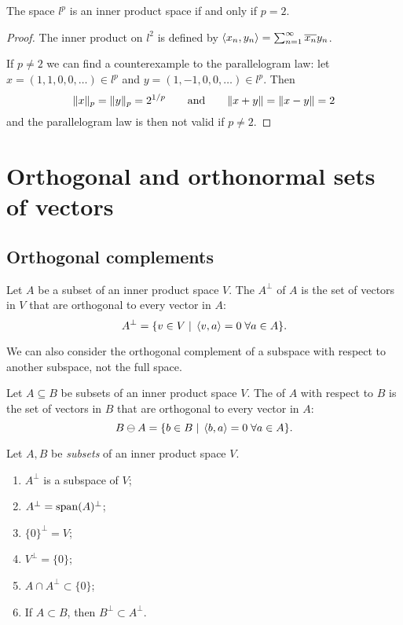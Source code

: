 \begin{corollary}
The space $l^p$ is an inner product space \textup{if and only if} $p=2$.
\end{corollary}
\begin{proof}
The inner product on $l^2$ is defined by $\left\langle x_n, y_n \right\rangle = \sum_{n=1}^\infty \overline{x_n}y_n$.

If $p\neq 2$ we can find a counterexample to the parallelogram law: let $x=(1,1,0,0,\ldots)\in l^p$ and $y = (1,-1,0,0,\ldots)\in l^p$. Then
\[ \lVert x\rVert_p = \lVert y\rVert_p = 2^{1/p} \qquad \text{and} \qquad \lVert x+y\rVert = \lVert x-y\rVert = 2 \]
and the parallelogram law is then not valid if $p\neq 2$.
\end{proof}

\section{Orthogonal and orthonormal sets of vectors}
\subsection{Orthogonal complements}
\begin{definition}
Let $A$ be a subset of an inner product space $V$. The  $A^\perp$ of $A$ is the set of vectors in $V$ that are orthogonal to every vector in $A$:
\[ A^\perp = \{ v\in V\;|\; \left\langle v,a \right\rangle=0\; \forall a\in A \}. \]
\end{definition}
We can also consider the orthogonal complement of a subspace with respect to another subspace, not the full space.
\begin{definition}
Let $A\subseteq B$ be subsets of an inner product space $V$. The  of $A$ with respect to $B$ is the set of vectors in $B$ that are orthogonal to every vector in $A$:
\[ B\ominus A = \{ b\in B\;|\; \left\langle b,a \right\rangle=0\; \forall a\in A \}. \]
\end{definition}

\begin{proposition} \label{prop:OrthogonalComplementProperties}
Let $A,B$ be \emph{subsets} of an inner product space $V$.
\begin{enumerate}
\item $A^\perp$ is a subspace of $V$;
\item $A^\perp = \operatorname{span}(A)^\perp$;
\item $\{0\}^\perp = V$;
\item $V^\perp = \{0\}$;
\item $A\cap A^\perp \subset \{0\}$;
\item If $A\subset B$, then $B^\perp \subset A^\perp$.
\end{enumerate}
\end{proposition}

